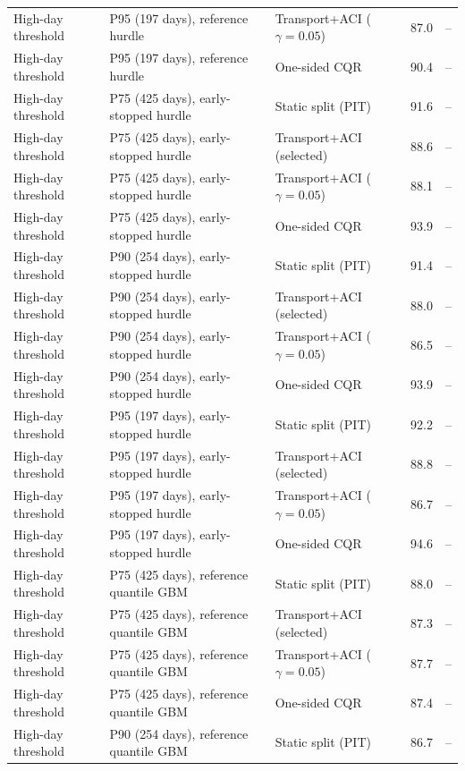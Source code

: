 \begin{table}[tp]
\begin{tabular}{l l l rr}
High-day threshold & P95 (197 days), reference hurdle & Transport+ACI ($\gamma=0.05$) & 87.0 & -- \\
High-day threshold & P95 (197 days), reference hurdle & One-sided CQR & 90.4 & -- \\
High-day threshold & P75 (425 days), early-stopped hurdle & Static split (PIT) & 91.6 & -- \\
High-day threshold & P75 (425 days), early-stopped hurdle & Transport+ACI (selected) & 88.6 & -- \\
High-day threshold & P75 (425 days), early-stopped hurdle & Transport+ACI ($\gamma=0.05$) & 88.1 & -- \\
High-day threshold & P75 (425 days), early-stopped hurdle & One-sided CQR & 93.9 & -- \\
High-day threshold & P90 (254 days), early-stopped hurdle & Static split (PIT) & 91.4 & -- \\
High-day threshold & P90 (254 days), early-stopped hurdle & Transport+ACI (selected) & 88.0 & -- \\
High-day threshold & P90 (254 days), early-stopped hurdle & Transport+ACI ($\gamma=0.05$) & 86.5 & -- \\
High-day threshold & P90 (254 days), early-stopped hurdle & One-sided CQR & 93.9 & -- \\
High-day threshold & P95 (197 days), early-stopped hurdle & Static split (PIT) & 92.2 & -- \\
High-day threshold & P95 (197 days), early-stopped hurdle & Transport+ACI (selected) & 88.8 & -- \\
High-day threshold & P95 (197 days), early-stopped hurdle & Transport+ACI ($\gamma=0.05$) & 86.7 & -- \\
High-day threshold & P95 (197 days), early-stopped hurdle & One-sided CQR & 94.6 & -- \\
High-day threshold & P75 (425 days), reference quantile GBM & Static split (PIT) & 88.0 & -- \\
High-day threshold & P75 (425 days), reference quantile GBM & Transport+ACI (selected) & 87.3 & -- \\
High-day threshold & P75 (425 days), reference quantile GBM & Transport+ACI ($\gamma=0.05$) & 87.7 & -- \\
High-day threshold & P75 (425 days), reference quantile GBM & One-sided CQR & 87.4 & -- \\
High-day threshold & P90 (254 days), reference quantile GBM & Static split (PIT) & 86.7 & -- \\

\end{tabular}
\end{table}
